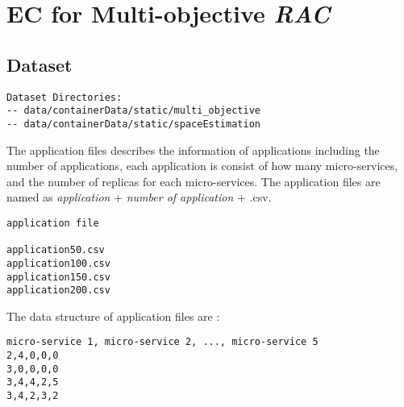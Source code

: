 \chapter{EC for Multi-objective \emph{RAC}}

\section{Dataset}
\begin{lstlisting}
Dataset Directories:
-- data/containerData/static/multi_objective
-- data/containerData/static/spaceEstimation
\end{lstlisting}







The application files describes the information of applications including the number of applications,
each application is consist of how many micro-services, and the number of replicas for each micro-services. 
The application files are named as \textit{application} + \textit{number of application} + .csv.
\begin{lstlisting}
application file
			
application50.csv
application100.csv
application150.csv
application200.csv
\end{lstlisting}



The data structure of application files are :
\begin{lstlisting}
micro-service 1, micro-service 2, ..., micro-service 5
2,4,0,0,0
3,0,0,0,0
3,4,4,2,5
3,4,2,3,2
\end{lstlisting}

